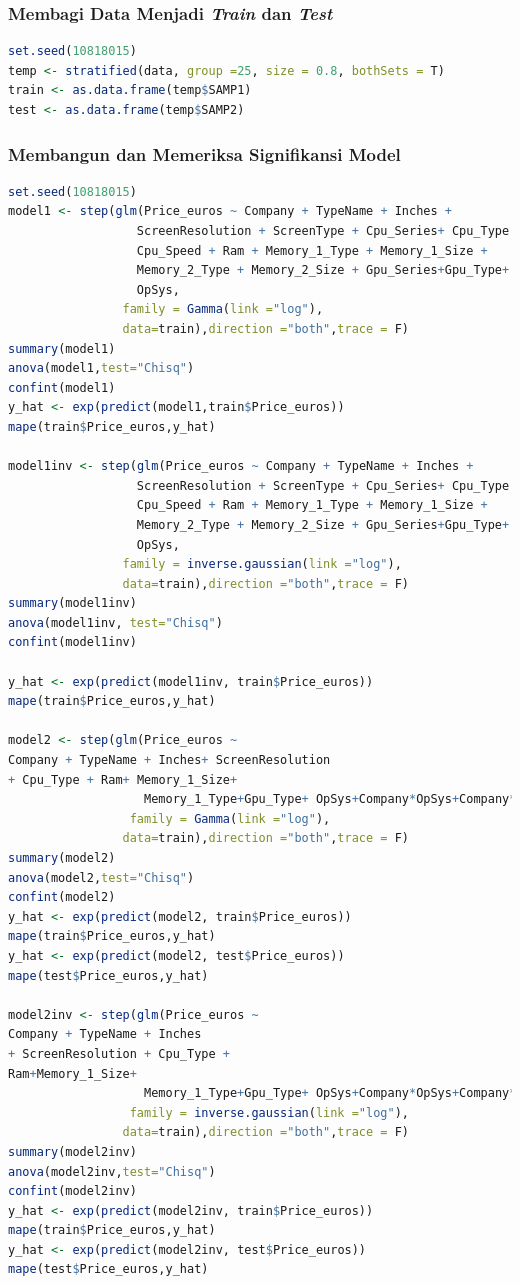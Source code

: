 \documentclass[12pt]{article}
\begin{document}
\subsubsection{Membagi Data Menjadi \textit{Train} dan \textit{Test}}
\begin{lstlisting}[language=R]
set.seed(10818015)
temp <- stratified(data, group =25, size = 0.8, bothSets = T)
train <- as.data.frame(temp$SAMP1)
test <- as.data.frame(temp$SAMP2)
\end{lstlisting}

\subsubsection{Membangun dan Memeriksa Signifikansi Model}
\begin{lstlisting}[language=R]
set.seed(10818015)
model1 <- step(glm(Price_euros ~ Company + TypeName + Inches +
                  ScreenResolution + ScreenType + Cpu_Series+ Cpu_Type +
                  Cpu_Speed + Ram + Memory_1_Type + Memory_1_Size +
                  Memory_2_Type + Memory_2_Size + Gpu_Series+Gpu_Type+
                  OpSys,
                family = Gamma(link ="log"),
                data=train),direction ="both",trace = F)
summary(model1)
anova(model1,test="Chisq")
confint(model1)
y_hat <- exp(predict(model1,train$Price_euros))
mape(train$Price_euros,y_hat)

model1inv <- step(glm(Price_euros ~ Company + TypeName + Inches +
                  ScreenResolution + ScreenType + Cpu_Series+ Cpu_Type +
                  Cpu_Speed + Ram + Memory_1_Type + Memory_1_Size +
                  Memory_2_Type + Memory_2_Size + Gpu_Series+Gpu_Type+
                  OpSys,
                family = inverse.gaussian(link ="log"),
                data=train),direction ="both",trace = F)
summary(model1inv)
anova(model1inv, test="Chisq")
confint(model1inv)

y_hat <- exp(predict(model1inv, train$Price_euros))
mape(train$Price_euros,y_hat)

model2 <- step(glm(Price_euros ~
Company + TypeName + Inches+ ScreenResolution
+ Cpu_Type + Ram+ Memory_1_Size+
                   Memory_1_Type+Gpu_Type+ OpSys+Company*OpSys+Company*TypeName ,
                 family = Gamma(link ="log"),
                data=train),direction ="both",trace = F)
summary(model2)
anova(model2,test="Chisq")
confint(model2)
y_hat <- exp(predict(model2, train$Price_euros))
mape(train$Price_euros,y_hat)
y_hat <- exp(predict(model2, test$Price_euros))
mape(test$Price_euros,y_hat)

model2inv <- step(glm(Price_euros ~
Company + TypeName + Inches
+ ScreenResolution + Cpu_Type +
Ram+Memory_1_Size+
                   Memory_1_Type+Gpu_Type+ OpSys+Company*OpSys+Company*TypeName ,
                 family = inverse.gaussian(link ="log"),
                data=train),direction ="both",trace = F)
summary(model2inv)
anova(model2inv,test="Chisq")
confint(model2inv)
y_hat <- exp(predict(model2inv, train$Price_euros))
mape(train$Price_euros,y_hat)
y_hat <- exp(predict(model2inv, test$Price_euros))
mape(test$Price_euros,y_hat)
\end{lstlisting}
\end{document}
